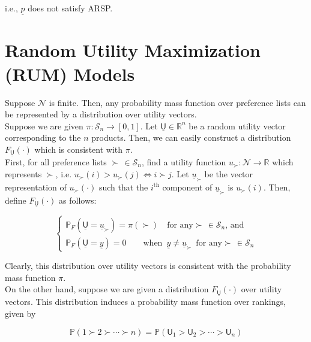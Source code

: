 \documentclass[11pt]{article}
\begin{document}
i.e., $\underline{p}$ does not satisfy ARSP.



\section{Random Utility Maximization (RUM) Models}

Suppose $\mathcal{N}$ is finite. Then, any probability mass function over preference lists can be represented by a distribution over utility vectors.
\\

Suppose we are given $\pi: \mathcal{S}_n \rightarrow [0,1]$. Let $\underline{\textsf{U}} \in \mathbb{R}^n$ be a random utility vector corresponding to the $n$ products. Then, we can easily construct a distribution $F_{\underline{\textsf{U}}}(\cdot)$ which is consistent with $\pi$. 
\\

First, for all preference lists $\succ \, \in \mathcal{S}_n$, find a utility function $u_{\succ} : \mathcal{N} \rightarrow \mathbb{R}$ which represents $\succ$, i.e. $u_{\succ}(i) > u_{\succ}(j) \Leftrightarrow i \succ j$. Let $\underline{u}_{\succ}$ be the vector representation of $u_{\succ}(\cdot)$ such that the $i^{\text{th}}$ component of $\underline{u}_{\succ}$ is $u_{\succ}(i)$. Then, define $F_{\underline{\textsf{U}}}(\cdot)$ as follows:

\begin{equation*}
\begin{cases} 
\mathbb{P}_F(\underline{\textsf{U}} = \underline{u}_{\succ}) = \pi(\succ) \quad \text{for any} \succ \, \in \mathcal{S}_n, \, \text{and} \\ 
\mathbb{P}_F(\underline{\textsf{U}} = \underline{y}) = 0 \qquad \text{when} \enspace \underline{y} \neq \underline{u}_{\succ} \enspace \text{for any} \succ \, \in \mathcal{S}_n
\end{cases}
\end{equation*}

Clearly, this distribution over utility vectors is consistent with the probability mass function $\pi$.
\\

On the other hand, suppose we are given a distribution $F_{\underline{\textsf{U}}}(\cdot)$ over utility vectors. This distribution induces a probability mass function over rankings, given by

\begin{equation*}
\mathbb{P} (1 \succ 2 \succ \cdots \succ n) = \mathbb{P} (\textsf{U}_1 > \textsf{U}_2 > \cdots > \textsf{U}_n)
\end{equation*}
\end{document}
